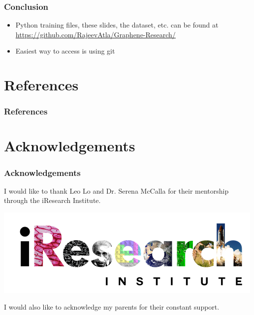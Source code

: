 \documentclass[12pt]{beamer}
\begin{document}
\begin{frame}
\frametitle{Conclusion}
\pause
\begin{itemize}
  \item Python training files, these slides, the dataset, etc. can be found at \url{https://github.com/RajeevAtla/Graphene-Research/}
  \pause
  \item Easiest way to access is using git
\end{itemize}



\end{frame}

\section{References}
\begin{frame}
\frametitle{References}
\end{frame}


\section{Acknowledgements}


\begin{frame}
\frametitle{Acknowledgements}
I would like to thank Leo Lo and Dr. Serena McCalla for their mentorship through the iResearch Institute.

\begin{center}
\includegraphics[scale = 0.58]{iresearch.png}
\end{center}

I would also like to acknowledge my parents for their constant support.
\end{frame}
\end{document}
